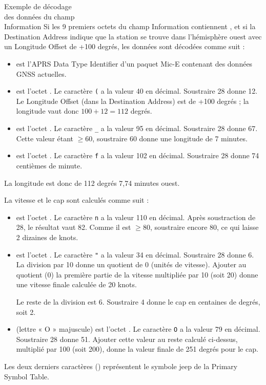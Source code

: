 \begin{aprssideblock}{Exemple de décodage\\des données du champ\\Information}
Si les 9 premiers octets du champ Information contiennent
, et si la Destination Address indique que la station se trouve
dans l'hémisphère ouest avec un Longitude Offset de +100 degrés, les données
sont décodées comme suit :

\begin{itemize}\chTenItems
\item {} est l'APRS Data Type Identifier d'un paquet Mic-E contenant des
  données GNSS actuelles.
\item \lit{(} est l'octet . Le caractère \texttt{(} a la valeur 40
  en décimal. Soustraire 28 donne 12. Le Longitude Offset (dans la Destination
  Address) est de +100 degrés ; la longitude vaut donc $100 + 12 = 112$ degrés.
\item \lit{\_} est l'octet . Le caractère \texttt{\_} a la valeur
  95 en décimal. Soustraire 28 donne 67. Cette valeur étant $\ge 60$, soustraire
  60 donne une longitude de 7 minutes.
\item {} est l'octet . Le caractère \texttt{f} a la valeur 102
  en décimal. Soustraire 28 donne 74 centièmes de minute.
\end{itemize}

La longitude est donc de 112 degrés 7,74 minutes ouest.

La vitesse et le cap sont calculés comme suit :

\begin{itemize}\chTenItems
\item {} est l'octet . Le caractère \texttt{n} a la valeur
  110 en décimal. Après soustraction de 28, le résultat vaut 82. Comme il est
  $\ge 80$, soustraire encore 80, ce qui laisse 2 dizaines de knots.
\item {} est l'octet . Le caractère \texttt{"} a la valeur 34
  en décimal. Soustraire 28 donne 6. La division par 10 donne un quotient de 0
  (unités de vitesse). Ajouter au quotient (0) la première partie de la vitesse
  multipliée par 10 (soit 20) donne une vitesse finale calculée de 20 knots.

  Le reste de la division est 6. Soustraire 4 donne le cap en centaines de
  degrés, soit 2.
\item {} (lettre « O » majuscule) est l'octet . Le caractère
  \texttt{O} a la valeur 79 en décimal. Soustraire 28 donne 51. Ajouter cette
  valeur au reste calculé ci-dessus, multiplié par 100 (soit 200), donne la
  valeur finale de 251 degrés pour le cap.
\end{itemize}

Les deux derniers caractères () représentent le symbole jeep de la
Primary Symbol Table.
\end{aprssideblock}

